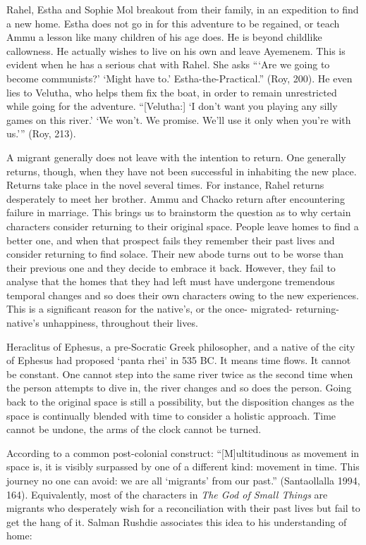 Rahel, Estha and Sophie Mol breakout from their family, in an expedition to find a new home. Estha does not go in for this adventure to be regained, or teach Ammu a lesson like many children of his age does. He is beyond childlike callowness. He actually wishes to live on his own and leave Ayemenem. This is evident when he has a serious chat with Rahel. She asks ```Are we going to become communists?' `Might have to.' Estha-the-Practical.'' (Roy, 200). He even lies to Velutha, who helps them fix the boat, in order to remain unrestricted while going for the adventure. ``[Velutha:] `I don’t want you playing any silly games on this river.' `We won’t. We promise. We’ll use it only when you’re with us.''' (Roy, 213). 

A migrant generally does not leave with the intention to return. One generally returns, though, when they have not been successful in inhabiting the new place. Returns take place in the novel several times. For instance, Rahel returns desperately to meet her brother. Ammu and Chacko return after encountering failure in marriage. This brings us to brainstorm the question as to why certain characters consider returning to their original space. People leave homes to find a better one, and when that prospect fails they remember their past lives and consider returning to find solace. Their new abode turns out to be worse than their previous one and they decide to embrace it back. However, they fail to analyse that the homes that they had left must have undergone tremendous temporal changes and so does their own characters owing to the new experiences. This is a significant reason for the native’s, or the once- migrated- returning- native’s unhappiness, throughout their lives. 

Heraclitus of Ephesus, a pre-Socratic Greek philosopher, and a native of the city of Ephesus had proposed ‘panta rhei’ in 535 BC. It means time flows. It cannot be constant. One cannot step into the same river twice as the second time when the person attempts to dive in, the river changes and so does the person. Going back to the original space is still a possibility, but the disposition changes as the space is continually blended with time to consider a holistic approach. Time cannot be undone, the arms of the clock cannot be turned. 

According to a common post-colonial construct: “[M]ultitudinous as movement in space is, it is visibly surpassed by one of a different kind: movement in time. This journey no one can avoid: we are all ‘migrants’ from our past.” (Santaollalla 1994, 164). Equivalently, most of the characters in \emph{The God of Small Things} are migrants who desperately wish for a reconciliation with their past lives but fail to get the hang of it. Salman Rushdie associates this idea to his understanding of home:

